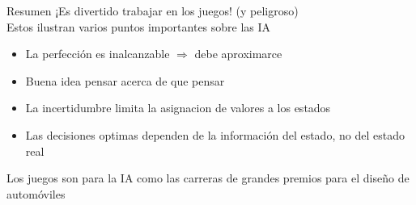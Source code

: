     \begin{frame}{Resumen }
        ¡Es divertido trabajar en los juegos! (y peligroso)\\
        Estos ilustran varios puntos importantes sobre las IA\\
        \begin{itemize}
            \item La perfección es inalcanzable $\Rightarrow$ debe aproximarce
            \item Buena idea pensar acerca de que pensar\\
            \item La incertidumbre limita la asignacion de valores a los estados\\
            \item Las decisiones optimas dependen de la información del estado, no del estado real\\
        \end{itemize}
        Los juegos son para la IA como las carreras de grandes premios para el diseño de automóviles
    \end{frame}